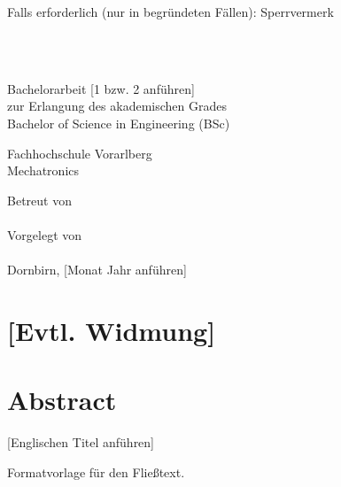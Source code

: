 \documentclass[a4paper,12pt]{scrreprt}
\begin{document}

Falls erforderlich (nur in begründeten Fällen): Sperrvermerk


\newpage
{} %
\begin{titlepage}
  \mbox{}
  \vspace{5mm}
  \begin{center}
    \huge{\textbf{}} \\
    \huge{\textbf{}}\\
  \end{center}
  \vspace{40mm}
  \begin{flushright}
  Bachelorarbeit [1 bzw. 2 anführen]\\
  zur Erlangung des akademischen Grades\\
  Bachelor of Science in Engineering (BSc)

  \vspace{20mm}
  Fachhochschule Vorarlberg\\
  Mechatronics

  \vspace{40mm}
  Betreut von\\\\
  Vorgelegt von\\\\

  \vspace{20mm}
  Dornbirn, [Monat Jahr anführen]
  \end{flushright}
\end{titlepage}


\chapter*{[Evtl. Widmung]}


\newpage
\chapter*{Abstract}
[Englischen Titel anführen]

Formatvorlage für den Fließtext.
\end{document}
